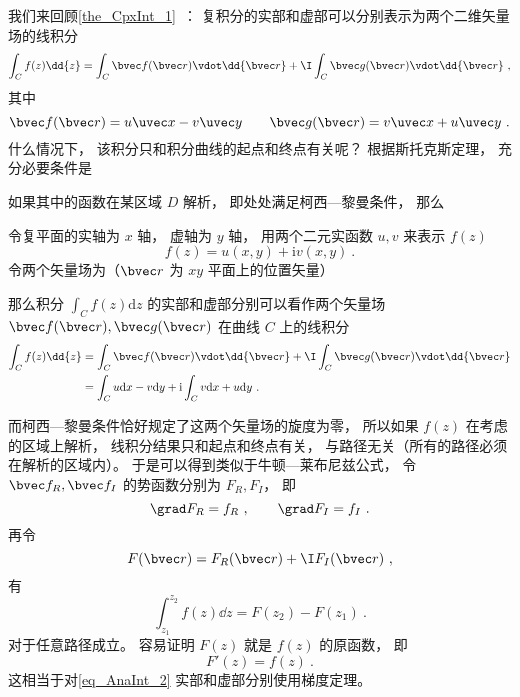 
\begin{issues}
\issueDraft
\end{issues}


我们来回顾\autoref{the_CpxInt_1}~： 复积分的实部和虚部可以分别表示为两个二维矢量场的线积分
\begin{equation}
\int_{C} f(z) \dd{z} = \int_C \bvec f(\bvec r) \vdot \dd{\bvec r} + \I \int_C \bvec g(\bvec r) \vdot \dd{\bvec r}~,
\end{equation}
其中
\begin{equation}
\bvec f(\bvec r) = u\uvec x - v\uvec y
\qquad
\bvec g(\bvec r) = v\uvec x + u\uvec y~.
\end{equation}
什么情况下， 该积分只和积分曲线的起点和终点有关呢？ 根据斯托克斯定理， 充分必要条件是

如果其中的函数在某区域 $D$ 解析， 即处处满足柯西—黎曼条件， 那么


\begin{theorem}{}
令复平面的实轴为 $x$ 轴， 虚轴为 $y$ 轴， 用两个二元实函数 $u, v$ 来表示 $f(z)$
\begin{equation}
f (z) = u(x, y) + \mathrm iv(x, y)~.
\end{equation}
令两个矢量场为（$\bvec r$ 为 $xy$ 平面上的位置矢量）

那么积分 $\int_{C} f(z) \mathrm{d} z$ 的实部和虚部分别可以看作两个矢量场 $\bvec f(\bvec r), \bvec g(\bvec r)$ 在曲线 $C$ 上的线积分
\begin{equation}
\begin{aligned}
\int_{C} f(z) \dd{z} &= \int_C \bvec f(\bvec r) \vdot \dd{\bvec r} + \I \int_C \bvec g(\bvec r) \vdot \dd{\bvec r}\\
&= \int_{C} u \mathrm{d} x-v \mathrm{d} y+\mathrm{i} \int_{C} v \mathrm{d} x+u \mathrm{d} y~.
\end{aligned}
\end{equation}
\end{theorem}

而柯西—黎曼条件恰好规定了这两个矢量场的旋度为零， 所以如果 $f(z)$ 在考虑的区域上解析， 线积分结果只和起点和终点有关， 与路径无关（所有的路径必须在解析的区域内）。 于是可以得到类似于牛顿—莱布尼兹公式， 令 $\bvec f_R, \bvec f_I$ 的势函数分别为 $F_R, F_I$， 即
\begin{equation}
\grad F_R = f_R~,
\qquad
\grad F_I = f_I~.
\end{equation}
再令
\begin{equation}
F(\bvec r) = F_R(\bvec r) + \I F_I(\bvec r)~,
\end{equation}
有
\begin{equation}\label{eq_AnaInt_2}
\int_{z_1}^{z_2} f(z) \dd{z} = F(z_2) - F(z_1)~.
\end{equation}
对于任意路径成立。 容易证明 $F(z)$ 就是 $f(z)$ 的原函数， 即
\begin{equation}
F'(z) = f(z)~.
\end{equation}
这相当于对\autoref{eq_AnaInt_2} 实部和虚部分别使用梯度定理。
